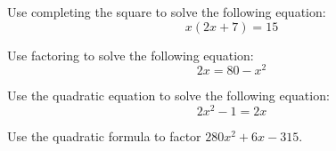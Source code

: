 \documentclass[11pt,letterpaper]{article}
\begin{document}

 Use completing the square to solve the following equation:
	\[
	x(2x + 7)= 15
	\]



\newpage



 Use factoring to solve the following equation:
	\[
	2x= 80 - x^2
	\]



\newpage



 Use the quadratic equation to solve the following equation:
	\[
	2x^2 - 1= 2x
	\]



\newpage



 Use the quadratic formula to factor $280x^2 + 6x - 315$. 
\end{document}
